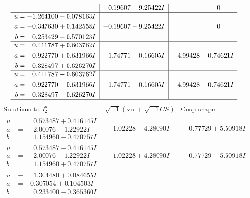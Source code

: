 \documentclass[1p]{elsarticle_modified}
\theoremstyle{definition}
\newcommand{\I}{\sqrt{-1}}
\begin{document}
$$\begin{array}{c|c|c}
 & -0.19607 + 9.25422 I & \phantom{-0.000000 } 0 \\ \hline\begin{aligned}
u &= -1.264100 - 0.078163 I \\
a &= -0.347630 + 0.142558 I \\
b &= \phantom{-}0.253429 - 0.570123 I\end{aligned}
 & -0.19607 - 9.25422 I & \phantom{-0.000000 } 0 \\ \hline\begin{aligned}
u &= \phantom{-}0.411787 + 0.603762 I \\
a &= \phantom{-}0.922770 + 0.631966 I \\
b &= -0.328497 + 0.626270 I\end{aligned}
 & -1.74771 - 0.16605 I & -4.99428 + 0.74621 I \\ \hline\begin{aligned}
u &= \phantom{-}0.411787 - 0.603762 I \\
a &= \phantom{-}0.922770 - 0.631966 I \\
b &= -0.328497 - 0.626270 I\end{aligned}
 & -1.74771 + 0.16605 I & -4.99428 - 0.74621 I\\
 \hline 
 \end{array}$$\newpage$$\begin{array}{c|c|c}  
\text{Solutions to }I^u_{2}& \I (\text{vol} + \sqrt{-1}CS) & \text{Cusp shape}\\
 \hline 
\begin{aligned}
u &= \phantom{-}0.573487 + 0.416145 I \\
a &= \phantom{-}2.00076 - 1.22922 I \\
b &= \phantom{-}1.154960 - 0.470757 I\end{aligned}
 & \phantom{-}1.02228 - 4.28090 I & \phantom{-}0.77729 + 5.50918 I \\ \hline\begin{aligned}
u &= \phantom{-}0.573487 - 0.416145 I \\
a &= \phantom{-}2.00076 + 1.22922 I \\
b &= \phantom{-}1.154960 + 0.470757 I\end{aligned}
 & \phantom{-}1.02228 + 4.28090 I & \phantom{-}0.77729 - 5.50918 I \\ \hline\begin{aligned}
u &= \phantom{-}1.304480 + 0.084655 I \\
a &= -0.307054 + 0.104503 I \\
b &= \phantom{-}0.233400 - 0.365360 I\end{aligned}

\end{array}$$
\end{document}
